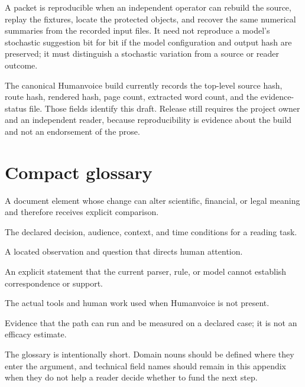 A packet is reproducible when an independent operator can rebuild the source,
replay the fixtures, locate the protected objects, and recover the same
numerical summaries from the recorded input files. It need not reproduce a
model's stochastic suggestion bit for bit if the model configuration and
output hash are preserved; it must distinguish a stochastic variation from a
source or reader outcome.

The canonical Humanvoice build currently records the top-level source hash,
route hash, rendered hash, page count, extracted word count, and the
evidence-status file. Those fields identify this draft. Release still
requires the project owner and an independent reader, because reproducibility
is evidence about the build and not an endorsement of the prose.

\section{Compact glossary}
\label{sec:manual-glossary}

\begin{description}[style=nextline,leftmargin=36mm,labelindent=0mm]
\item[Protected object] A document element whose change can alter scientific,
financial, or legal meaning and therefore receives explicit comparison.
\item[Reading brief] The declared decision, audience, context, and time
conditions for a reading task.
\item[Finding] A located observation and question that directs human attention.
\item[Abstention] An explicit statement that the current parser, rule, or model
cannot establish correspondence or support.
\item[Incumbent bundle] The actual tools and human work used when Humanvoice is
not present.
\item[Feasibility evidence] Evidence that the path can run and be measured on a
declared case; it is not an efficacy estimate.
\end{description}

The glossary is intentionally short. Domain nouns should be defined where they
enter the argument, and technical field names should remain in this appendix
when they do not help a reader decide whether to fund the next step.
